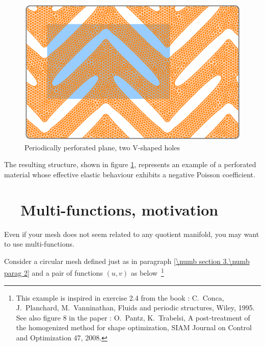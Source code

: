 \begin{figure}[ht] \centering
  \includegraphics[width=140mm]{boomerang-3.eps}
  \caption{Periodically perforated plane, two V-shaped holes}
  \label{\numb section 7.\numb fig 21}
\end{figure}

The resulting structure, shown in figure \ref{\numb section 7.\numb fig 21},
represents an example of a perforated material whose effective elastic behaviour
exhibits a negative Poisson coefficient.


\section{~~Multi-functions, motivation}  \label{\numb section 7.\numb parag 24}

Even if your mesh does not seem related to any quotient manifold, you may want to use multi-functions.

Consider a circular mesh defined just as in paragraph \ref{\numb section 3.\numb parag 2}
and a pair of functions $ (u,v) $ as below$\,$%
\footnote {{} This example is inspired in exercise 2.4 from the book : C.\ Conca, J.\ Planchard,
M.\ Vanninathan, Fluids and periodic structures, Wiley, 1995. See also figure 8 in the paper :
O.\ Pantz, K.\ Trabelsi, A post-treatment of the homogenized method for shape optimization,
SIAM Journal on Control and Optimization 47, 2008.} %

